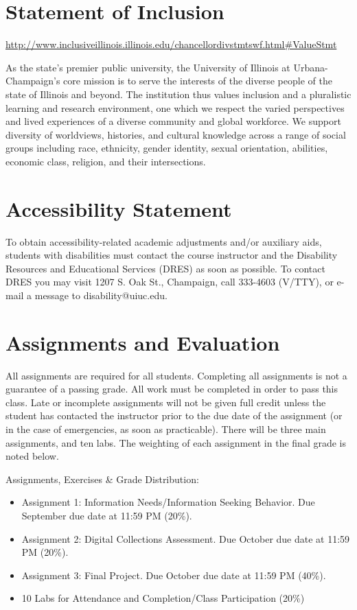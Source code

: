 \documentclass[]{article}
\providecommand{\tightlist}{%
  \setlength{\itemsep}{0pt}\setlength{\parskip}{0pt}}
\begin{document}
\section{Statement of Inclusion}\label{statement-of-inclusion}

\url{http://www.inclusiveillinois.illinois.edu/chancellordivstmtswf.html\#ValueStmt}

As the state's premier public university, the University of Illinois at
Urbana-Champaign's core mission is to serve the interests of the diverse
people of the state of Illinois and beyond. The institution thus values
inclusion and a pluralistic learning and research environment, one which
we respect the varied perspectives and lived experiences of a diverse
community and global workforce. We support diversity of worldviews,
histories, and cultural knowledge across a range of social groups
including race, ethnicity, gender identity, sexual orientation,
abilities, economic class, religion, and their intersections.

\section{Accessibility Statement}\label{accessibility-statement}

To obtain accessibility-related academic adjustments and/or auxiliary
aids, students with disabilities must contact the course instructor and
the Disability Resources and Educational Services (DRES) as soon as
possible. To contact DRES you may visit 1207 S. Oak St., Champaign, call
333-4603 (V/TTY), or e-mail a message to disability@uiuc.edu.

\section{Assignments and Evaluation}\label{assignments-and-evaluation}

All assignments are required for all students. Completing all
assignments is not a guarantee of a passing grade. All work must be
completed in order to pass this class. Late or incomplete assignments
will not be given full credit unless the student has contacted the
instructor prior to the due date of the assignment (or in the case of
emergencies, as soon as practicable). There will be three main
assignments, and ten labs. The weighting of each assignment in the final
grade is noted below.

Assignments, Exercises \& Grade Distribution:

\begin{itemize}
\tightlist
\item
  Assignment 1: Information Needs/Information Seeking Behavior. Due
  September due date at 11:59 PM (20\%).
\item
  Assignment 2: Digital Collections Assessment. Due October due date at
  11:59 PM (20\%).
\item
  Assignment 3: Final Project. Due October due date at 11:59 PM (40\%).
\item
  10 Labs for Attendance and Completion/Class Participation (20\%)
\end{itemize}
\end{document}
